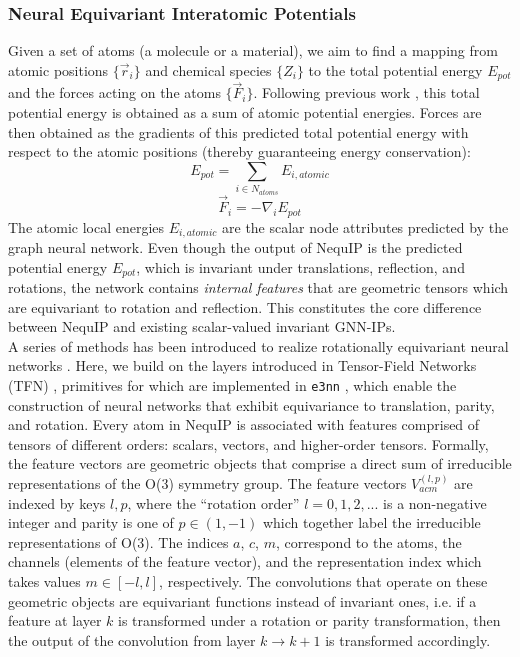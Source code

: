 \documentclass[11pt]{article}
\begin{document}
\subsubsection{Neural Equivariant Interatomic Potentials}
Given a set of atoms (a molecule or a material), we aim to find a mapping from atomic positions $\{\vec{r}_i\}$ and chemical species $\{Z_i\}$ to the total potential energy $E_{pot}$ and the forces acting on the atoms $\{\vec{F}_i\}$. Following previous work \cite{behler2007generalized}, this total potential energy is obtained as a sum of atomic potential energies. Forces are then obtained as the gradients of this predicted total potential energy with respect to the atomic positions (thereby guaranteeing energy conservation): 
\begin{equation}
    E_{pot} = \sum_{i \in N_{atoms}} E_{i, atomic}
\label{pot_e_sum}
\end{equation}
%
\begin{equation}
    \vec{F}_i = - \nabla_i E_{pot}
\label{eq:forces_gradient}
\end{equation}
The atomic local energies $E_{i, atomic}$ are the scalar node attributes predicted by the graph neural network. Even though the output of NequIP is the predicted potential energy $E_{pot}$, which is invariant under translations, reflection, and rotations, the network contains \textit{internal features} that are geometric tensors which are equivariant to rotation and reflection. This constitutes the core difference between NequIP and existing scalar-valued invariant GNN-IPs.\\

A series of methods has been introduced to realize rotationally equivariant neural networks \cite{thomas2018tensor, weiler20183d, kondor2018n,  kondor2018clebsch, gnnff}. Here, we build on the layers introduced in Tensor-Field Networks (TFN) \cite{thomas2018tensor}, primitives for which are implemented in \texttt{e3nn} \cite{mario_geiger_2021_4735637}, which enable the construction of neural networks that exhibit equivariance to translation, parity, and rotation. Every atom in NequIP is associated with features comprised of tensors of different orders: scalars, vectors, and higher-order tensors. Formally, the feature vectors are geometric objects that comprise a direct sum of irreducible representations of the O(3) symmetry group. The feature vectors $V_{acm}^{(l,p)}$ are indexed by keys $l,p$, where the ``rotation order'' $l=0, 1,2,...$ is a non-negative integer and parity is one of $p \in (1, -1)$ which together label the irreducible representations of O(3). The indices $a$, $c$, $m$, correspond to the atoms, the channels (elements of the feature vector), and the representation index which takes values $m \in [-l, l]$, respectively. The convolutions that operate on these geometric objects are equivariant functions instead of invariant ones, i.e. if a feature at layer $k$ is transformed under a rotation or parity transformation, then the output of the convolution from layer $k \rightarrow k+1$ is transformed accordingly. 
\\
\end{document}
